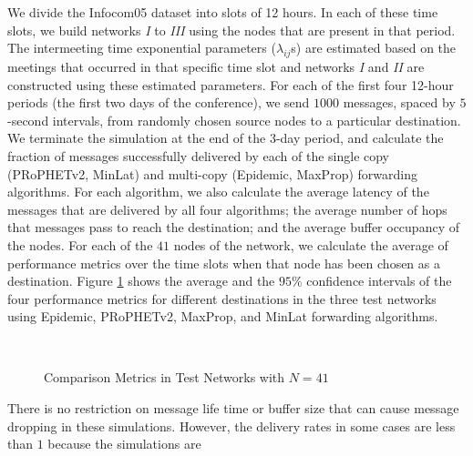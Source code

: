\documentclass[journal,onecolumn,11pt]{IEEEtran}
\theoremstyle{plain}
\theoremstyle{definition}
\begin{document}
We divide the Infocom05 dataset into slots of 12 hours. In each of
these time slots, we build networks \textit{I} to \textit{III} using
the nodes that are present in that period. The intermeeting time
exponential parameters ($\lambda_{ij}$s) are estimated based on the
meetings that occurred in that specific time slot and networks
\textit{I} and \textit{II} are constructed using these estimated
parameters. For each of the first four 12-hour periods (the first two
days of the conference), we send
$1000$ messages, spaced by $5$-second intervals, from randomly chosen
source nodes to a particular destination. We terminate the simulation
at the end of the 3-day period, and calculate the fraction of messages
successfully delivered by each of the single copy (PRoPHETv2, MinLat)
and multi-copy (Epidemic, MaxProp) forwarding algorithms. For each
algorithm, we also calculate the average latency of the messages that
are delivered by all four algorithms; the average number of hops that
messages pass to reach the destination; and the average buffer
occupancy of the nodes. For each of the $41$ nodes of the network, we calculate the average of
performance metrics over the time slots when that node has been chosen
as a destination. Figure \ref{fig:res1} shows the average and the
$95\%$ confidence intervals of the four performance metrics for
different destinations in the three test networks using Epidemic,
PRoPHETv2, MaxProp, and MinLat forwarding algorithms.
\begin{figure}[!htb]
\centering
{}\hspace*{0.08in}
\\

\hspace*{0.009in} \hspace*{0.05in}
\caption{Comparison Metrics in Test Networks with $N=41$}
\label{fig:res1}
\end{figure}
There is no restriction on message life time or buffer size that can
cause message dropping in these simulations. However, the delivery
rates in some cases are less than $1$ because the simulations are
\end{document}
